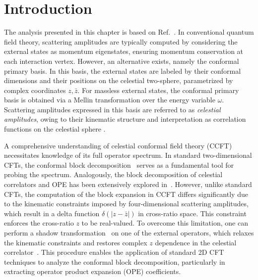 
\section{Introduction}
The analysis presented in this chapter is based on Ref.~\cite{Bhattacharyya:2025sky}.
In conventional quantum field theory, scattering amplitudes are typically computed by considering the external states as momentum eigenstates, ensuring momentum conservation at each interaction vertex. However, an alternative exists, namely the conformal primary basis. In this basis, the external states are labeled by their conformal dimensions and their positions on the celestial two-sphere, parametrized by complex coordinates \( z, \bar{z} \). For massless external states, the conformal primary basis is obtained via a Mellin transformation over the energy variable \( \omega \). Scattering amplitudes expressed in this basis are referred to as \textit{celestial amplitudes}, owing to their kinematic structure and interpretation as correlation functions on the celestial sphere \cite{Pasterski:2016qvg}.\par
A comprehensive understanding of celestial conformal field theory (CCFT) necessitates knowledge of its full operator spectrum. In standard two-dimensional CFTs, the conformal block decomposition~\cite{Osborn:2012vt,Poland:2018epd} serves as a fundamental tool for probing the spectrum. Analogously, the block decomposition of celestial correlators and OPE has been extensively explored in~\cite{Lam:2017ofc, Nandan:2019jas, Law:2020xcf, Fan:2021isc,Fan:2022vbz,Fan:2022kpp,Atanasov:2021cje,De:2022gjn,Garcia-Sepulveda:2022lga, Banerjee:2023jne}. However, unlike standard CFTs, the computation of the block expansion in CCFT differs significantly due to the kinematic constraints imposed by four-dimensional scattering amplitudes, which result in a delta function \(\delta(|z - \bar{z}|)\) in cross-ratio space. This constraint enforces the cross-ratio \(z\) to be real-valued.
To overcome this limitation, one can perform a shadow transformation~\cite{FERRARA1972281,Ferrara:1972kab,Simmons-Duffin:2012juh} on one of the external operators, which relaxes the kinematic constraints and restores complex \(z\) dependence in the celestial correlator~\cite{Fan:2021isc}. This procedure enables the application of standard 2D CFT techniques to analyze the conformal block decomposition, particularly in extracting operator product expansion (OPE) coefficients.
